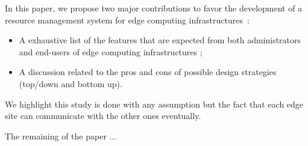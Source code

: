 In this paper, we propose two major contributions to favor the development of a resource management system for edge computing infrastructures~:
\begin{itemize}
\item A exhaustive list of the features that are expected from both administrators and end-users of edge computing infrastructures ; 
\item A discussion related to the pros and cons of possible design strategies (top/down and bottom up).
\end{itemize}

We highlight this study is done with any assumption but the fact that each edge site can communicate with the other ones eventually.

The remaining of the paper ...



